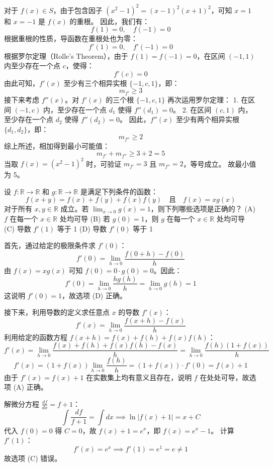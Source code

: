 \begin{questions}
\begin{solution}
对于 $f(x) \in S$，由于包含因子 $(x^2 - 1)^2 = (x - 1)^2(x + 1)^2$，可知 $x = 1$ 和 $x = -1$ 是 $f(x)$ 的重根。
因此，我们有：
\[
f(1) = 0, \quad f(-1) = 0
\]
根据重根的性质，导函数在重根处也为零：
\[
f'(1) = 0, \quad f'(-1) = 0
\]
根据罗尔定理（Rolle's Theorem），由于 $f(1) = f(-1) = 0$，在区间 $(-1, 1)$ 内至少存在一个点 $c$，使得：
\[
f'(c) = 0
\]
由此可知，$f'(x)$ 至少有三个相异实根 $\{-1, c, 1\}$，即：
\[
m_{f'} \geq 3
\]
接下来考虑 $f''(x)$。对 $f'(x)$ 的三个根 $\{-1, c, 1\}$ 再次运用罗尔定理：
1. 在区间 $(-1, c)$ 内，至少存在一个点 $d_1$ 使得 $f''(d_1) = 0$。
2. 在区间 $(c, 1)$ 内，至少存在一个点 $d_2$ 使得 $f''(d_2) = 0$。
因此，$f''(x)$ 至少有两个相异实根 $\{d_1, d_2\}$，即：
\[
m_{f''} \geq 2
\]
综上所述，相加得到最小可能值：
\[
m_{f'} + m_{f''} \geq 3 + 2 = 5
\]
当取 $f(x) = (x^2 - 1)^2$ 时，可验证 $m_{f'} = 3$ 且 $m_{f''} = 2$，等号成立。
故最小值为 5。
\end{solution}

\question
设 $f: \mathbb{R} \to \mathbb{R}$ 和 $g: \mathbb{R} \to \mathbb{R}$ 是满足下列条件的函数：
\[
f(x + y) = f(x) + f(y) + f(x)f(y) \quad \text{且} \quad f(x) = xg(x)
\]
对于所有 $x, y \in \mathbb{R}$ 成立。若 $\lim_{x \to 0} g(x) = 1$，则下列哪些选项是正确的？
(A) $f$ 在每一个 $x \in \mathbb{R}$ 处均可导
(B) 若 $g(0) = 1$，则 $g$ 在每一个 $x \in \mathbb{R}$ 处均可导
(C) 导数 $f'(1)$ 等于 1
(D) 导数 $f'(0)$ 等于 1

\begin{solution}
首先，通过给定的极限条件求 $f'(0)$：
\[
f'(0) = \lim_{h \to 0} \frac{f(0+h) - f(0)}{h}
\]
由 $f(x) = xg(x)$ 可知 $f(0) = 0 \cdot g(0) = 0$。因此：
\[
f'(0) = \lim_{h \to 0} \frac{hg(h)}{h} = \lim_{h \to 0} g(h) = 1
\]
这说明 $f'(0) = 1$，故选项 (D) 正确。

接下来，利用导数的定义求任意点 $x$ 的导数 $f'(x)$：
\[
f'(x) = \lim_{h \to 0} \frac{f(x + h) - f(x)}{h}
\]
利用给定的函数方程 $f(x + h) = f(x) + f(h) + f(x)f(h)$：
\[
f'(x) = \lim_{h \to 0} \frac{f(x) + f(h) + f(x)f(h) - f(x)}{h} = \lim_{h \to 0} \frac{f(h)(1 + f(x))}{h}
\]
\[
f'(x) = (1 + f(x)) \lim_{h \to 0} \frac{f(h)}{h} = (1 + f(x)) \cdot f'(0) = f(x) + 1
\]
由于 $f'(x) = f(x) + 1$ 在实数集上均有意义且存在，说明 $f$ 在处处可导，故选项 (A) 正确。

解微分方程 $\frac{df}{dx} = f + 1$：
\[
\int \frac{df}{f + 1} = \int dx \implies \ln|f(x) + 1| = x + C
\]
代入 $f(0) = 0$ 得 $C = 0$，故 $f(x) + 1 = e^x$，即 $f(x) = e^x - 1$。
计算 $f'(1)$：
\[
f'(x) = e^x \implies f'(1) = e^1 = e \neq 1
\]
故选项 (C) 错误。


\end{solution}
\end{questions}
